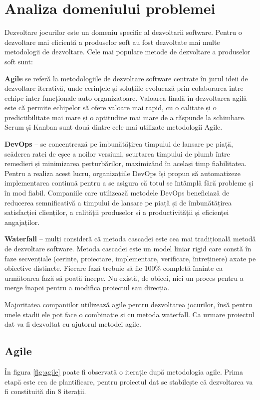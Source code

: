 \clearpage
\section{Analiza domeniului problemei}

Dezvoltare jocurilor este un domeniu specific al dezvoltarii software. Pentru o dezvoltare mai eficientă a produselor soft au fost dezvoltate mai multe metodologii de dezvoltare. Cele mai populare metode de dezvoltare a produselor soft sunt:

\textbf{Agile} se referă la metodologiile de dezvoltare software centrate în jurul ideii de dezvoltare iterativă, unde cerințele și soluțiile evoluează prin colaborarea între echipe inter-funcționale auto-organizatoare. Valoarea finală în dezvoltarea agilă este că permite echipelor să ofere valoare mai rapid, cu o calitate și o predictibilitate mai mare și o aptitudine mai mare de a răspunde la schimbare. Scrum și Kanban sunt două dintre cele mai utilizate metodologii Agile.

\textbf{DevOps} -- se concentrează pe îmbunătățirea timpului de lansare pe piață, scăderea ratei de eșec a noilor versiuni, scurtarea timpului de plumb între remedieri și minimizarea perturbărilor, maximizând în același timp fiabilitatea. Pentru a realiza acest lucru, organizațiile DevOps își propun să automatizeze implementarea continuă pentru a se asigura că totul se întâmplă fără probleme și în mod fiabil. Companiile care utilizează metodele DevOps beneficiază de reducerea semnificativă a timpului de lansare pe piață și de îmbunătățirea satisfacției clienților, a calității produselor și a productivității și eficienței angajaților.

\textbf{Waterfall} -- mulți consideră că metoda cascadei este cea mai tradițională metodă de dezvoltare software. Metoda cascadei este un model liniar rigid care constă în faze secvențiale (cerințe, proiectare, implementare, verificare, întreținere) axate pe obiective distincte. Fiecare fază trebuie să fie 100\% completă înainte ca următoarea fază să poată începe. Nu există, de obicei, nici un proces pentru a merge înapoi pentru a modifica proiectul sau direcția.

Majoritatea companiilor utilizează agile pentru dezvoltarea jocurilor, însă pentru unele stadii ele pot face o combinație și cu metoda waterfall. Ca urmare proiectul dat va fi dezvoltat cu ajutorul metodei agile.

\subsection{Agile}
În figura \ref{fig:agile} poate fi observată o iterație după metodologia agile. Prima etapă este cea de plantificare, pentru proiectul dat se stabilește că dezvoltarea va fi constituită din 8 iterații.

